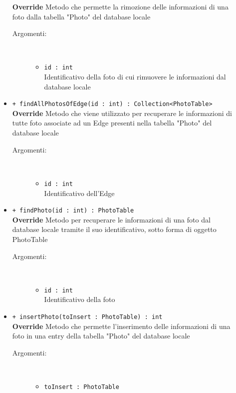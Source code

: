 \documentclass[../DefinizioneDiProdotto.tex]{subfiles}
\begin{document}
\begin{description}
\begin{itemize}
		\textbf{Override} Metodo che permette la rimozione delle informazioni di una foto dalla tabella "Photo" del database locale
		\begin{description}
			\item[Argomenti:] \
			\begin{itemize}
				\item \texttt{id : int}\\
				Identificativo della foto di cui rimuovere le informazioni dal database locale\end{itemize}
		\end{description}
		\item \texttt{+ findAllPhotosOfEdge(id : int) : Collection<PhotoTable>}\\
		\textbf{Override} Metodo che viene utilizzato per recuperare le informazioni di tutte foto associate ad un Edge presenti nella tabella "Photo" del database locale
		\begin{description}
			\item[Argomenti:] \
			\begin{itemize}
				\item \texttt{id : int}\\
				Identificativo dell'Edge\end{itemize}
		\end{description}
		\item \texttt{+ findPhoto(id : int) : PhotoTable}\\
		\textbf{Override} Metodo per recuperare le informazioni di una foto dal database locale tramite il suo identificativo, sotto forma di oggetto PhotoTable
		\begin{description}
			\item[Argomenti:] \
			\begin{itemize}
				\item \texttt{id : int}\\
				Identificativo della foto\end{itemize}
		\end{description}
		\item \texttt{+ insertPhoto(toInsert : PhotoTable) : int}\\
		\textbf{Override} Metodo che permette l'inserimento delle informazioni di una foto in una entry della tabella "Photo" del database locale
		\begin{description}
			\item[Argomenti:] \
			\begin{itemize}
				\item \texttt{toInsert : PhotoTable}\\

\end{itemize}
\end{description}
\end{itemize}
\end{description}
\end{document}
